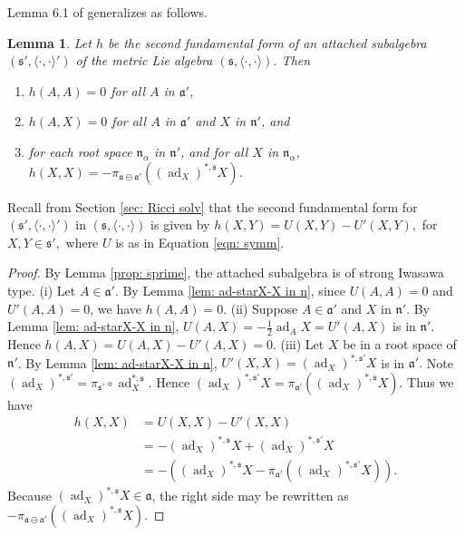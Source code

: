 \documentclass[12pt]{amsart}
\newcommand{\fraka}{\ensuremath{\mathfrak{a}} }
\newcommand{\frakn}{\ensuremath{\mathfrak{n}} }
\newcommand{\fraks}{\ensuremath{\mathfrak{s}} }
\renewcommand\a{{\mathfrak{a}}}
\newcommand\n{{\mathfrak{n}}}
\newcommand\s{{\mathfrak{s}}}
\newcommand\ip{{\langle\cdot {,} \cdot\rangle}}
\newcommand\ad{\operatorname{ad}}
\theoremstyle{plain}
\newtheorem{lemma}[theorem]{Lemma}
\theoremstyle{definition}
\theoremstyle{remark}
\numberwithin{equation}{section}
\numberwithin{theorem}{section}
\begin{document}
Lemma 6.1 of \cite{tamaru-11} generalizes as follows.
\begin{lemma}\label{lem: secondfundform}
Let $h$ be the second fundamental form of an attached subalgebra $(\s',\ip')$ of the metric Lie algebra $(\s,\ip)$. Then 
\begin{enumerate}
\item $h(A,A)=0$ for all $A$ in $\a'$,  \label{h on A is zero}
\item $h(A,X) =0$ for all $A$ in $\a'$ and $X$ in  $\n'$, and 
\item for each root space $\n_\alpha$  in  $\n'$,  and for all  $X$ in  $\n_\alpha$, $h(X, X) = -\pi_{\a \ominus  \a'}((\ad_{X})^{*,\fraks} X)$.\label{h root vector}
\end{enumerate}
\end{lemma}
Recall from Section \ref{sec: Ricci solv} that 
 the second fundamental form 
for $(\fraks', \ip')$ in $(\fraks,\ip)$ is given by 
$h(X,Y) =
U(X,Y) - U'(X,Y),$
for $X,Y \in \fraks',$ where $U$ is as in Equation \eqref{eqn: symm}. 

\begin{proof} By Lemma \ref{prop: sprime}, the attached subalgebra is of strong Iwasawa type.
(i) Let $A \in \a'$.  By Lemma \ref{lem: ad-starX-X in n}, since $U(A,A)=0$ and
 $U'(A,A)=0$, we have $h(A,A)=0$. 
(ii) Suppose $A \in \fraka'$ and $X$ in $\frakn'$.  By Lemma \ref{lem: ad-starX-X in n},  $U(A,X) = -\tfrac12 \ad_A X = U'(A,X)$ is in $\frakn'$.  Hence $h(A,X)=U(A,X)-U'(A,X)=0.$ 
(iii) Let  $X$ be  in  a root space of $\n'$. 
  By Lemma \ref{lem: ad-starX-X in n},  $U'(X, X) =  (\ad_{X})^{\ast, \fraks'} X$ is in  $\fraka'.$ 
Note $(\ad_{X})^{\ast, \fraks'} = \pi_{\fraks'} \circ \ad_{X}^{\ast, \fraks}$.  Hence $(\ad_{X})^{\ast, \fraks'} X =  \pi_{\a'}((\ad_{X})^{\ast, \fraks} X)$.   Thus we have
\begin{align*}
h(X,X) &=  U(X,X) - U'(X,X) \\ 
&= -(\ad_{X})^{*,\fraks} X + (\ad_{X})^{*,\fraks'} X\\
&= -((\ad_{X})^{*,\fraks} X - \pi_{\fraka'}((\ad_{X})^{*,\fraks'} X)).
      \end{align*}
Because  $(\ad_{X})^{*,\fraks} X \in \fraka$, the right side may be rewritten as $-\pi_{\a \ominus \a'}((\ad_{X})^{\ast,\fraks} X)$.
\end{proof}
\end{document}
